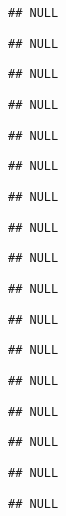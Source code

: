 \documentclass[]{article}
\begin{document}
\begin{verbatim}
## NULL
\end{verbatim}

\begin{verbatim}
## NULL
\end{verbatim}

\begin{verbatim}
## NULL
\end{verbatim}

\begin{verbatim}
## NULL
\end{verbatim}

\begin{verbatim}
## NULL
\end{verbatim}

\begin{verbatim}
## NULL
\end{verbatim}

\begin{verbatim}
## NULL
\end{verbatim}

\begin{verbatim}
## NULL
\end{verbatim}

\begin{verbatim}
## NULL
\end{verbatim}

\begin{verbatim}
## NULL
\end{verbatim}

\begin{verbatim}
## NULL
\end{verbatim}

\begin{verbatim}
## NULL
\end{verbatim}

\begin{verbatim}
## NULL
\end{verbatim}

\begin{verbatim}
## NULL
\end{verbatim}

\begin{verbatim}
## NULL
\end{verbatim}

\begin{verbatim}
## NULL
\end{verbatim}

\begin{verbatim}
## NULL
\end{verbatim}
\end{document}
